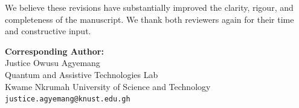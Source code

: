 \documentclass[11pt,a4paper]{article}
\begin{document}
\vspace{12pt}
\noindent
We believe these revisions have substantially improved the clarity, rigour, and
completeness of the manuscript. We thank both reviewers again for their time and
constructive input.

\vspace{24pt}
\noindent\textbf{Corresponding Author:}\\
Justice Owusu Agyemang\\
Quantum and Assistive Technologies Lab\\
Kwame Nkrumah University of Science and Technology\\
\texttt{justice.agyemang@knust.edu.gh}
\end{document}
